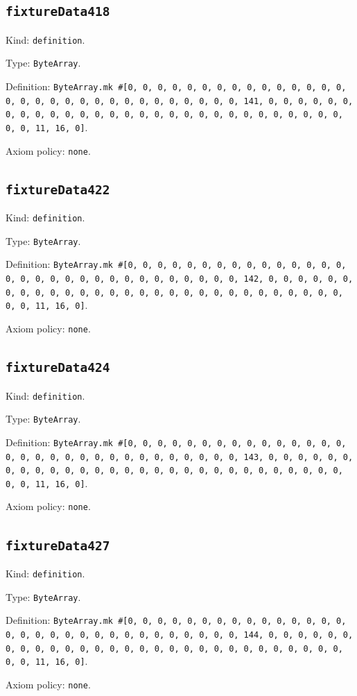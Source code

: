 \documentclass[11pt]{article}
\begin{document}
\subsection*{\texttt{fixtureData418}}
\noindent Kind: \texttt{definition}.\par
\noindent Type: \texttt{ByteArray}.\par
\noindent Definition: \texttt{ByteArray.mk \#[0, 0, 0, 0, 0, 0, 0, 0, 0, 0, 0, 0, 0, 0, 0, 0, 0, 0, 0, 0, 0, 0, 0, 0, 0, 0, 0, 0, 0, 0, 0, 141, 0, 0, 0, 0, 0, 0, 0, 0, 0, 0, 0, 0, 0, 0, 0, 0, 0, 0, 0, 0, 0, 0, 0, 0, 0, 0, 0, 0, 0, 0, 0, 11, 16, 0]}.\par
\noindent Axiom policy: \texttt{none}.\par
\subsection*{\texttt{fixtureData422}}
\noindent Kind: \texttt{definition}.\par
\noindent Type: \texttt{ByteArray}.\par
\noindent Definition: \texttt{ByteArray.mk \#[0, 0, 0, 0, 0, 0, 0, 0, 0, 0, 0, 0, 0, 0, 0, 0, 0, 0, 0, 0, 0, 0, 0, 0, 0, 0, 0, 0, 0, 0, 0, 142, 0, 0, 0, 0, 0, 0, 0, 0, 0, 0, 0, 0, 0, 0, 0, 0, 0, 0, 0, 0, 0, 0, 0, 0, 0, 0, 0, 0, 0, 0, 0, 11, 16, 0]}.\par
\noindent Axiom policy: \texttt{none}.\par
\subsection*{\texttt{fixtureData424}}
\noindent Kind: \texttt{definition}.\par
\noindent Type: \texttt{ByteArray}.\par
\noindent Definition: \texttt{ByteArray.mk \#[0, 0, 0, 0, 0, 0, 0, 0, 0, 0, 0, 0, 0, 0, 0, 0, 0, 0, 0, 0, 0, 0, 0, 0, 0, 0, 0, 0, 0, 0, 0, 143, 0, 0, 0, 0, 0, 0, 0, 0, 0, 0, 0, 0, 0, 0, 0, 0, 0, 0, 0, 0, 0, 0, 0, 0, 0, 0, 0, 0, 0, 0, 0, 11, 16, 0]}.\par
\noindent Axiom policy: \texttt{none}.\par
\subsection*{\texttt{fixtureData427}}
\noindent Kind: \texttt{definition}.\par
\noindent Type: \texttt{ByteArray}.\par
\noindent Definition: \texttt{ByteArray.mk \#[0, 0, 0, 0, 0, 0, 0, 0, 0, 0, 0, 0, 0, 0, 0, 0, 0, 0, 0, 0, 0, 0, 0, 0, 0, 0, 0, 0, 0, 0, 0, 144, 0, 0, 0, 0, 0, 0, 0, 0, 0, 0, 0, 0, 0, 0, 0, 0, 0, 0, 0, 0, 0, 0, 0, 0, 0, 0, 0, 0, 0, 0, 0, 11, 16, 0]}.\par
\noindent Axiom policy: \texttt{none}.\par
\end{document}
